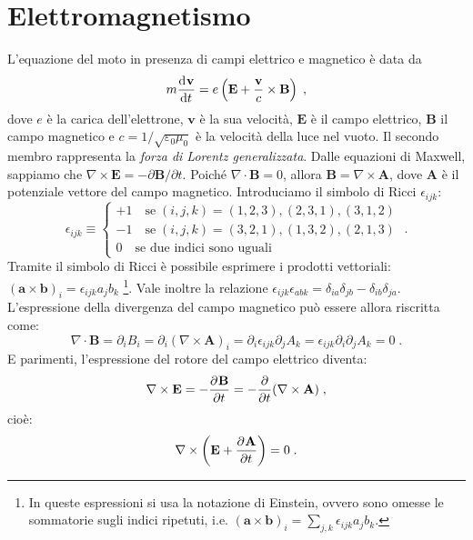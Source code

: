 \section{Elettromagnetismo}
L'equazione del moto in presenza di campi elettrico e magnetico è data da
\begin{equation}
m\frac{\mathrm{d}^{}\mathbf{v}}{\mathrm{d}t^{}}=e\left(\mathbf{E}+\frac{\mathbf{v}}{c}\times\mathbf{B}\right)\;,
\end{equation}
dove $e$ è la carica dell'elettrone, $\mathbf{v}$ è la sua velocità, $\mathbf{E}$ è il campo elettrico, $\mathbf{B}$ il campo magnetico e $c=1/\sqrt{\varepsilon_0\mu_0}$ è la velocità della luce nel vuoto. Il secondo membro rappresenta la \textit{forza di Lorentz generalizzata}. Dalle equazioni di Maxwell, sappiamo che $\nabla\times\mathbf{E}=-\partial\mathbf{B}/\partial t$. Poiché $\nabla\cdot\mathbf{B}=0$, allora $\mathbf{B}=\nabla\times\mathbf{A}$, dove $\mathbf{A}$ è il potenziale vettore del campo magnetico. Introduciamo il simbolo di Ricci $\epsilon_{ijk}$:
\begin{equation}
\epsilon_{ijk}\equiv
\begin{cases}
+1 \quad\mbox{se}\; (i,j,k)=(1,2,3),(2,3,1),(3,1,2) \\
-1 \quad\mbox{se}\; (i,j,k)=(3,2,1),(1,3,2),(2,1,3) \\
0 \quad\mbox{se due indici sono uguali}
\end{cases}\;.
\end{equation}
Tramite il simbolo di Ricci è possibile esprimere i prodotti vettoriali: $(\mathbf{a}\times\mathbf{b})_i=\epsilon_{ijk}a_jb_k$ \footnote{In queste espressioni si usa la notazione di Einstein, ovvero sono omesse le sommatorie sugli indici ripetuti, i.e. $(\mathbf{a}\times\mathbf{b})_i=\sum_{j,k}\epsilon_{ijk}a_jb_k$.}. Vale inoltre la relazione $\epsilon_{ijk}\epsilon_{abk}=\delta_{ia}\delta_{jb}-\delta_{ib}\delta_{ja}$. L'espressione della divergenza del campo magnetico può essere allora riscritta come:
\begin{equation}
\nabla\cdot\mathbf{B}=\partial_iB_i=\partial_i(\nabla\times\mathbf{A})_i=\partial_i\epsilon_{ijk}\partial_jA_k=
\epsilon_{ijk}\partial_i\partial_jA_k=0\;.
\end{equation}
E parimenti, l'espressione del rotore del campo elettrico diventa:
\begin{equation}
\nabla\times\mathbf{E}=-\frac{\partial^{}\mathbf{B}}{\partial t^{}}=-\frac{\partial}{\partial t}(\nabla\times\mathbf{A})\;,
\end{equation}
cioè:
\begin{equation}
\nabla\times\left(\mathbf{E}+\frac{\partial^{}\mathbf{A}}{\partial t^{}}\right)=0\;.
\end{equation}
